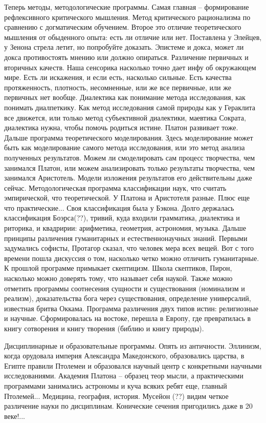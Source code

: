 \documentclass[a4paper, 12pt]{article}
\begin{document}
Теперь методы, методологические программы. Самая главная -- формирование 
рефлексивного критического мышления. Метод критического рационализма по 
сравнению с догматическим обучением.%
Второе это отличие теоретического мышления от обыденного опыта: есть ли 
отличие или нет. Поставлена у Элейцев, у Зенона стрела летит, но 
попробуйте доказать. Эпистеме и докса, может ли докса противостоять 
мнению или должно опираться.%
Различение первичных и вторичных качеств. Наша сенсорика насколько точно 
дает инфу об окружающем мире. Есть ли искажения, и если есть, насколько 
сильные. Есть качества протяженность, плотность, несомненные, или же все 
первичные, или же первичных нет вообще.%
Диалектика как понимание метода исследования, как понимать диалпеткику. 
Как метод исследования самой природы как у Гераклита все движется, или 
только метод субъективной диалектики, маевтика Сократа, диалектика 
нужна, чтобы помочь родиться истине. Платон развивает тоже.%
Дальше программа теоретического моделирования. Здесь моделирование может 
быть как моделирование самого метода исследования, или это метод анализа 
полученных результатов. Можем ли смоделировать сам процесс творчества, 
чем занимался Платон, или можем анализировать только результаты 
творчества, чем занимался Аристотель. Модели изложения результатов его 
действительны даже сейчас.%
Методологическая программа классификации наук, что считать эмпирической, 
что теоретической. У Платона и Аристотеля разные. Плюс еще что 
практические... Своя классификация была у Бэкона. Долго держалась 
классификация Боэрса(??), тривий, куда входили грамматика, диалектика 
и риторика, и квадририи: арифметика, геометрия, астрономия, музыка.%
Дальше принципы различения гуманитарных и естественнонаучных знаний. 
Первыми задумались софисты, Протагор сказал, что человек мера всех 
вещей. Вот с того времени пошла дискуссия о том, насколько четко можно 
отличить гуманитарные.%
К прошлой программе примыкает скептицизм. Школа скептиков, Пирон, 
насколько можно доверять тому, что называет себя наукой.%
Также можно отметить программы соотнесения сущности и существования 
(номинализм и реализм), доказательства бога через существования, 
определение универсалий, известная бритва Оккама.%
Программа различения двух типов истин: религиозные и научные. 
Сформировалась на востоке, перешла в Европу, где превратилась в книгу 
сотворения и книгу творения (библию и книгу природы).

Дисциплинарные и образовательные программы. Опять из античности. 
Эллинизм, когда орудовала империя Александра Македонского, образовались 
царства, в Египте правили Птолемеи и образовался научный центр 
с конкретными научными исследованиями. Академия Платона -- образец теор 
мысли, а практическими программами занимались астрономы и куча всяких 
ребят еще, главный Птолемей... Медицина, география, история. Мусейон 
(??) видим четкое различение науки по дисциплинам. Конические сечения 
пригодились даже в 20 веке!...
\end{document}
